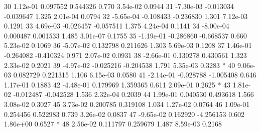 \begin{Schunk}
\begin{Soutput}
30  1.12e-01  0.097552  0.544326 0.770 3.54e-02 0.0944    
31 -7.30e-03 -0.013034 -0.039647 1.325 2.01e-04 0.0794    
32 -5.65e-04 -0.108433 -0.236830 1.301 7.12e-03 0.1291    
33  4.69e-03 -0.026457 -0.057511 1.375 4.24e-04 0.1141    
34 -8.00e-04  0.000487  0.001533 1.485 3.01e-07 0.1755    
35 -1.19e-01 -0.286860 -0.668537 0.660 5.23e-02 0.1069    
36 -5.07e-02  0.132798  0.211626 1.303 5.69e-03 0.1208    
37  1.46e-01 -0.264082 -0.410324 0.971 2.07e-02 0.0931    
38 -2.66e-01  0.130278  0.430561 1.323 2.33e-02 0.2021    
39 -4.97e-02 -0.025216 -0.204538 1.791 5.35e-03 0.3283   *
40  9.06e-03  0.082729  0.221315 1.106 6.15e-03 0.0580    
41 -2.14e-01 -0.028788 -1.005408 0.646 1.17e-01 0.1883    
42 -4.48e-01  0.179969  1.359365 0.611 2.09e-01 0.2625   *
43  1.81e-02 -0.012487 -0.042528 1.536 2.32e-04 0.2039    
44  1.99e-01  0.040530  0.493618 1.566 3.08e-02 0.3027    
45  3.73e-02  0.200785  0.319108 1.034 1.27e-02 0.0764    
46  1.09e-01  0.254456  0.522983 0.739 3.26e-02 0.0837    
47 -9.65e-02  0.162920 -4.256153 0.602 1.86e+00 0.6527   *
48  2.56e-02  0.111797  0.259679 1.487 8.59e-03 0.2168    
\end{Soutput}
\end{Schunk}
